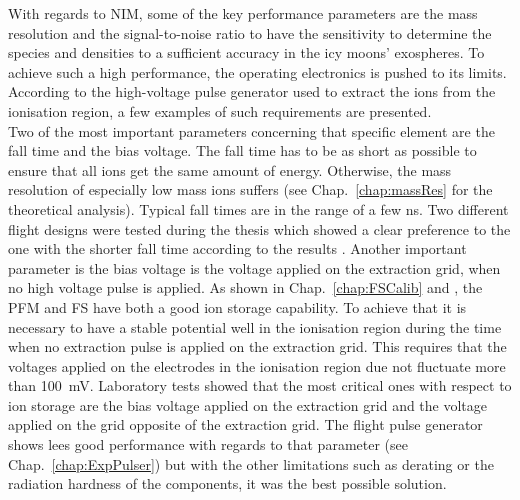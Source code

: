 	With regards to NIM, some of the key performance parameters are the mass resolution and the signal-to-noise ratio to have the sensitivity to determine the species and densities to a sufficient accuracy in the icy moons' exospheres. To achieve such a high performance, the operating electronics is pushed to its limits. According to the high-voltage pulse generator used to extract the ions from the ionisation region, a few examples of such requirements are presented.\\
	Two of the most important parameters concerning that specific element are the fall time and the bias voltage. The fall time has to be as short as possible to ensure that all ions get the same amount of energy. Otherwise, the mass resolution of especially low mass ions suffers (see Chap.~\ref{chap:massRes} for the theoretical analysis). Typical fall times are in the range of a few ns. Two different flight designs were tested during the thesis which showed a clear preference to the one with the shorter fall time according to the results \cite{Lasi_IEEE2020}. Another important parameter is the bias voltage is the voltage applied on the extraction grid, when no high voltage pulse is applied. As shown in Chap.~\ref{chap:FSCalib} and \cite{Foehn2021}, the PFM and FS have both a good ion storage capability. To achieve that it is necessary to have a stable potential well in the ionisation region during the time when no extraction pulse is applied on the extraction grid. This requires that the voltages applied on the electrodes in the ionisation region due not fluctuate more than 100~mV. Laboratory tests showed that the most critical ones with respect to ion storage are the bias voltage applied on the extraction grid and the voltage applied on the grid opposite of the extraction grid. The flight pulse generator shows lees good performance with regards to that parameter (see Chap.~\ref{chap:ExpPulser}) but with the other limitations such as derating or the radiation hardness of the components, it was the best possible solution.\\
